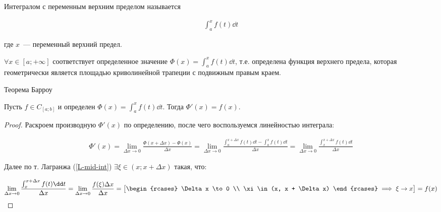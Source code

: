 
\begin{twocolumns}
  
  \columnbreak

  \begin{definition}
    Интегралом с переменным верхним пределом называется
    
    \begin{align*}
      \int_{a}^{x} f(t) \dd t
    \end{align*}

    где \(x\)~--- переменный верхний предел.
  \end{definition}

  \begin{remark}
    \(\forall x \in [a; +\infty]\) соответствует определенное значение
    \(\Phi(x) = \int_{a}^{x} f(t) \dd t\), т.е. определена функция верхнего
    предела, которая геометрически является площадью криволинейной трапеции
    с подвижным правым краем.
  \end{remark}
\end{twocolumns}

\begin{theorem}\label{Barrow}
  Теорема Барроу

  Пусть \(f \in C_{[a; b]}\) и определен \(\Phi(x) = \int_{a}^{x} f(t) \dd t\).
  Тогда \(\Phi'(x) = f(x)\).
\end{theorem}
\begin{proof}
  Раскроем производную \(\Phi'(x)\) по определению, после чего воспользуемся
  линейностью интеграла:

  \begin{align*}
    \Phi'(x)
    = \lim_{\Delta x \to 0} \frac{\Phi(x + \Delta x) - \Phi(x)}{\Delta x}
    = \lim_{\Delta x \to 0} \frac{
      \int_{a}^{x + \Delta x} f(t) \dd t - \int_{a}^{x} f(t) \dd t
    }{\Delta x}
    = \lim_{\Delta x \to 0} \frac{\int_{x}^{x + \Delta x} f(t) \dd t}{\Delta x}
  \end{align*}

  Далее по т. Лагранжа (\ref{L-mid-int}) \(\exists \xi \in (x; x + \Delta x)\)
  такая, что:

  \begin{align*}
    \lim_{\Delta x \to 0} \frac{\int_{x}^{x + \Delta x} f(t) \dd t}{\Delta x}
    = \lim_{\Delta x \to 0} \frac{f(\xi) \Delta x}{\Delta x}
    = \begin{bmatrix}
      \begin{rcases}
        \Delta x \to 0 \\
        \xi \in (x, x + \Delta x)
      \end{rcases}
      \implies \xi \to x
    \end{bmatrix}
    = f(x)
  \end{align*}
\end{proof}